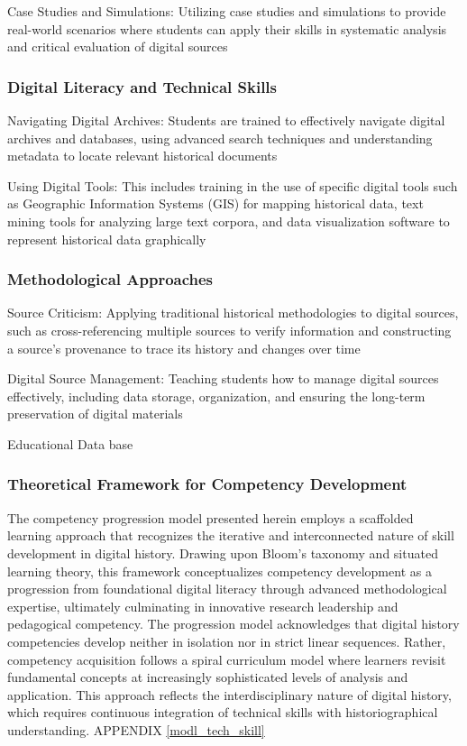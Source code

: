Case Studies and Simulations: Utilizing case studies and simulations to provide real-world scenarios where students can apply their skills in systematic analysis and critical evaluation of digital sources \cite{Milligan}

\subsubsection{Digital Literacy and Technical Skills}
Navigating Digital Archives: Students are trained to effectively navigate digital archives and databases, using advanced search techniques and understanding metadata to locate relevant historical documents

Using Digital Tools: This includes training in the use of specific digital tools such as Geographic Information Systems (GIS) for mapping historical data, text mining tools for analyzing large text corpora, and data visualization software to represent historical data graphically \cite{Milligan}

\subsubsection{Methodological Approaches}
Source Criticism: Applying traditional historical methodologies to digital sources, such as cross-referencing multiple sources to verify information and constructing a source’s provenance to trace its history and changes over time

Digital Source Management: Teaching students how to manage digital sources effectively, including data storage, organization, and ensuring the long-term preservation of digital materials \cite{Milligan}

Educational Data base

\subsubsection{Theoretical Framework for Competency Development}
The competency progression model presented herein employs a scaffolded learning approach that recognizes the iterative and interconnected nature of skill development in digital history. Drawing upon Bloom's taxonomy and situated learning theory, this framework conceptualizes competency development as a progression from foundational digital literacy through advanced methodological expertise, ultimately culminating in innovative research leadership and pedagogical competency.
The progression model acknowledges that digital history competencies develop neither in isolation nor in strict linear sequences. Rather, competency acquisition follows a spiral curriculum model where learners revisit fundamental concepts at increasingly sophisticated levels of analysis and application. This approach reflects the interdisciplinary nature of digital history, which requires continuous integration of technical skills with historiographical understanding.
APPENDIX \ref{modl_tech_skill}

